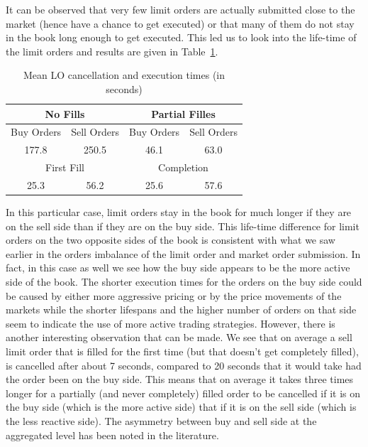 It can be observed that very few limit orders are actually submitted close to the market (hence have a chance to get executed) or that many of them do not stay in the book long enough to get executed. This led us to look into the life-time of the limit orders and results are given in Table~\ref{tab:meanlo}.
	\begin{table}[!ht]
	\centering
	\caption{Mean LO cancellation and execution times (in seconds) \label{tab:meanlo}}
	\begin{tabular}{cccc}
	\multicolumn{2}{c}{No Fills} & \multicolumn{2}{c}{Partial Filles} \\ \hline
	Buy Orders & Sell Orders & Buy Orders & Sell Orders \\ \hline
	177.8 & 250.5 & 46.1 & 63.0 \\ \hline
	\multicolumn{2}{c}{First Fill} & \multicolumn{2}{c}{Completion} \\ \hline
	 25.3 & 56.2 & 25.6 & 57.6
	\end{tabular}
	\end{table}
In this particular case, limit orders stay in the book for much longer if they are on the sell side than if they are on the buy side. This life-time difference for limit orders on the two opposite sides of the book is consistent with what we saw earlier in the orders imbalance of the limit order and market order submission. In fact, in this case as well we see how the buy side appears to be the more active side of the book. The shorter execution times for the orders on the buy side could be caused by either more aggressive pricing or by the price movements of the markets while the shorter lifespans and the higher number of orders on that side seem to indicate the use of more active trading strategies. However, there is another interesting observation that can be made. We see that on average a sell limit order that is filled for the first time (but that doesn't get completely filled), is cancelled after about 7 seconds, compared to 20 seconds that it would take had the order been on the buy side. This means that on average it takes three times longer for a partially (and never completely) filled order to be cancelled if it is on the buy side (which is the more active side) that if it is on the sell side (which is the less reactive side). The asymmetry between buy and sell side at the aggregated level has been noted in the literature.


